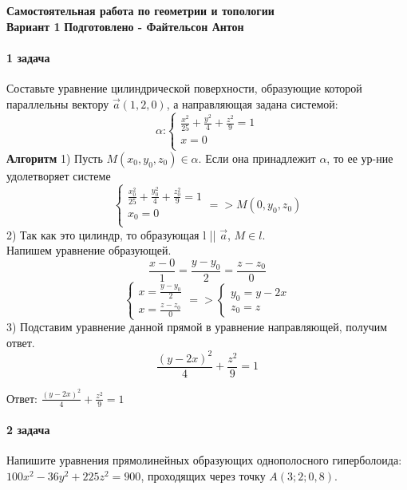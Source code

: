 \documentclass[a4paper,14pt]{extreport} %
\begin{document}
  
\begin{center}
    \textbf{Самостоятельная работа по геометрии и топологии} \\
    \textbf{Вариант 1}
    \textbf{Подготовлено - Файтельсон Антон}
\end{center}

\noindent


\paragraph {1 задача}
 Составьте уравнение цилиндрической поверхности, образующие которой параллельны вектору $\vec{a} (1,2,0)$, а направляющая задана системой:
\[
  \alpha \text{:}
\begin{cases}
    \frac{x^2}{25} + \frac{y^2}{4}+ \frac{z^2}{9}= 1 \\
    x = 0\\
\end{cases}
\]
\textbf{Алгоритм}
1) Пусть $M(x_0, y_0, z_0) \in \alpha$.  Если она принадлежит $\alpha$, 
то ее ур-ние удолетворяет системе
\[  
\begin{cases}
    \frac{x_0^2}{25} + \frac{y_0^2}{4}+ \frac{z_0^2}{9}= 1 \\
    x_0 = 0\\
\end{cases}
=> M(0, y_0, z_0)
\]
2) Так как это цилиндр, то образующая l || $\vec{a}$, $M \in l$. \\ 
Напишем уравнение образующей. 
\[
  \frac{x-0}{1} = \frac{y-y_0}{2} = \frac{z-z_0}{0}
\]
\[
  \begin{cases}
     x = \frac{y-y_0}{2}\\ 
     x = \frac{z-z_0}{0}
  \end{cases} => 
  \begin{cases}
    y_0 = y - 2x \\ 
    z_0 = z
  \end{cases} 
\]
3) Подставим уравнение данной прямой в уравнение направляющей, получим ответ. 
\[
  \frac{(y-2x)^2}{4} + \frac{z^2}{9} = 1
\]

Ответ: $\frac{(y-2x)^2}{4} + \frac{z^2}{9} = 1$

\noindent
\paragraph {2 задача}
Напишите уравнения прямолинейных образующих однополосного гиперболоида: $100x^2 - 36y^2 + 225z^2 = 900$, проходящих через точку $A(3; 2; 0,8)$.
\end{document}
